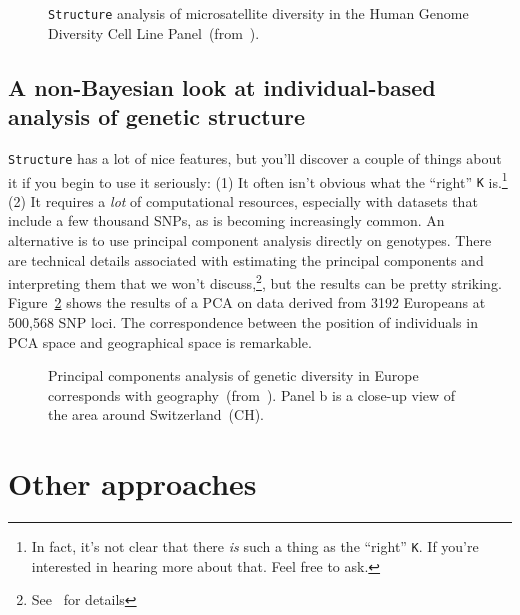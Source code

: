 \documentclass[12pt]{article}
\begin{document}
\begin{figure}
\caption{{\tt Structure} analysis of microsatellite diversity in the
  Human Genome Diversity Cell Line
  Panel~(from~\cite{Rosenberg-etal-2002}).}\label{fig:HGDP-CEPH} 
\end{figure}

\subsection*{A non-Bayesian look at individual-based analysis of
  genetic structure}

{\tt Structure} has a lot of nice features, but you'll discover a
couple of things about it if you begin to use it seriously: (1) It
often isn't obvious what the ``right'' {\tt K} is.\footnote{In fact,
  it's not clear that there {\it is\/} such a thing as the ``right''
  {\tt K}. If you're interested in hearing more about that. Feel free
  to ask.} (2) It requires a {\it lot\/} of computational resources,
especially with datasets that include a few thousand SNPs, as is
becoming increasingly common. An alternative is to use principal
component analysis directly on genotypes. There are technical details
associated with estimating the principal components and interpreting
them that we won't discuss,\footnote{See~\cite{Novembre-Stephens-2008}
  for details}, but the results can be pretty
striking. Figure~\ref{fig:human-PCA} shows the results of a PCA on
data derived from 3192 Europeans at 500,568 SNP loci. The
correspondence between the position of individuals in PCA space and
geographical space is remarkable. 

\begin{figure}
\caption{Principal components analysis of genetic diversity in Europe
  corresponds with
  geography~(from~\cite{Novembre-etal-2008}). Panel b is a close-up
  view of the area around Switzerland~(CH).}\label{fig:human-PCA}
\end{figure}

\section*{Other approaches}
\end{document}
